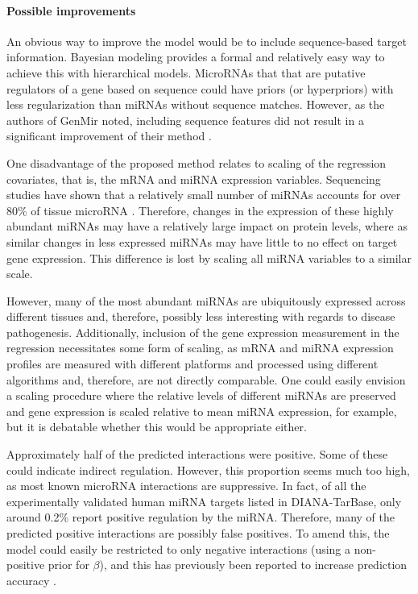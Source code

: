 \paragraph*{Possible improvements}

An obvious way to improve the model would be to include sequence-based target
information. Bayesian modeling provides a formal and relatively easy way to
achieve this with hierarchical models. MicroRNAs that that are putative
regulators of a gene based on sequence could have priors (or hyperpriors) with
less regularization than miRNAs without sequence matches. However, as
the authors of GenMir noted, including sequence features did not result
in a significant improvement of their method \citep{Huang2007}.

One disadvantage of the proposed method relates to scaling of the regression
covariates, that is, the mRNA and miRNA expression variables. Sequencing studies have shown
that a relatively small number of miRNAs accounts for over 80\% of tissue microRNA
\citep{Landgraf2007}. Therefore, changes in the expression of these highly
abundant miRNAs may have a relatively large impact on protein levels, where as
similar changes in less expressed miRNAs may have little to no effect on target gene
expression. This difference is lost by scaling all miRNA variables to a similar scale.

However, many of the most abundant miRNAs are ubiquitously expressed across
different tissues \citep{Landgraf2007} and, therefore, possibly less
interesting with regards to disease pathogenesis. Additionally, inclusion of
the gene expression measurement in the regression necessitates some form of
scaling, as mRNA and miRNA expression profiles are measured with different platforms
and processed using different algorithms and, therefore, are not directly
comparable. One could easily envision a scaling procedure where the relative
levels of different miRNAs are preserved and gene expression is scaled
relative to mean miRNA expression, for example, but it is debatable whether
this would be appropriate either.

Approximately half of the predicted interactions were positive. Some of these
could indicate indirect regulation. However, this proportion seems much too
high, as most known microRNA interactions are suppressive. In fact, of all the
experimentally validated human miRNA targets listed in DIANA-TarBase, only
around 0.2\% report positive regulation by the miRNA. Therefore, many of the
predicted positive interactions are possibly false positives. To amend this,
the model could easily be restricted to only negative interactions (using a
non-positive prior for $\beta$), and this has previously been reported to
increase prediction accuracy \citep{Muniategui2013}.

